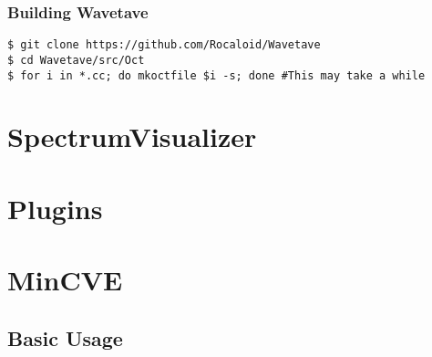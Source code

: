        \subsubsection{Building Wavetave}\indent
        
        \lstset{language = bash, tabsize = 4}
        
        \begin{lstlisting}
$ git clone https://github.com/Rocaloid/Wavetave
$ cd Wavetave/src/Oct
$ for i in *.cc; do mkoctfile $i -s; done #This may take a while
        \end{lstlisting}

\section{SpectrumVisualizer}
        
        
        
\section{Plugins}

\section{MinCVE}

\subsection{Basic Usage}


